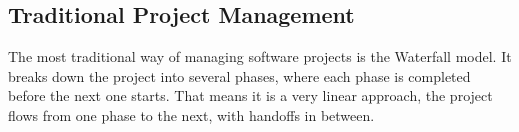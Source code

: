 \newpage
\subsection{Traditional Project Management}
The most traditional way of managing software projects is the Waterfall model. It breaks down the
project into several phases, where each phase is completed before the next one starts. That means
it is a very linear approach, the project flows from one phase to the next, with handoffs in
between. 

